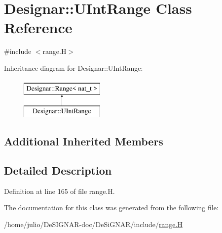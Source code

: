 \hypertarget{class_designar_1_1_u_int_range}{}\section{Designar\+:\+:U\+Int\+Range Class Reference}
\label{class_designar_1_1_u_int_range}


{\ttfamily \#include $<$range.\+H$>$}

Inheritance diagram for Designar\+:\+:U\+Int\+Range\+:\begin{figure}[H]
\begin{center}
\leavevmode
\includegraphics[height=2.000000cm]{class_designar_1_1_u_int_range}
\end{center}
\end{figure}
\subsection*{Additional Inherited Members}


\subsection{Detailed Description}


Definition at line 165 of file range.\+H.



The documentation for this class was generated from the following file\+:\begin{DoxyCompactItemize}
\item 
/home/julio/\+De\+S\+I\+G\+N\+A\+R-\/doc/\+De\+Si\+G\+N\+A\+R/include/\hyperlink{range_8_h}{range.\+H}\end{DoxyCompactItemize}
